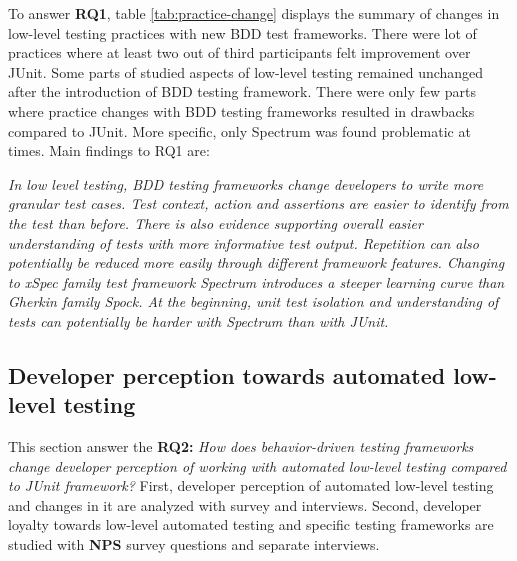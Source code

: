 To answer \textbf{RQ1}, table \ref{tab:practice-change} displays the summary of changes in low-level testing practices with new BDD test
frameworks. There were lot of practices where at least two out of third participants felt improvement over JUnit.
Some parts of studied aspects of low-level testing remained unchanged after the introduction of BDD testing framework.
There were only few parts where practice changes with BDD testing frameworks resulted in drawbacks compared to JUnit. More
specific, only Spectrum was found problematic at times. Main findings to RQ1 are:

\vskip 1mm
\begin{topbot}
\textit{In low level testing, BDD testing frameworks change developers to write more granular test cases. Test
context, action and assertions are easier to identify from the test than before. There is also evidence supporting
overall easier understanding of tests with more informative test output. Repetition can also potentially be reduced more easily through
different framework features.
\newline\newline Changing to xSpec family test framework Spectrum introduces a steeper learning curve than Gherkin family Spock.
At the beginning, unit test isolation and understanding of tests can potentially be harder with Spectrum than with JUnit.}
\end{topbot}

\clearpage


\subsection{Developer perception towards automated low-level testing}
This section answer the
\textbf{RQ2: }\textit{How does behavior-driven testing frameworks change developer perception of working with automated low-level
testing compared to JUnit framework?} First, developer perception of automated low-level testing and changes in it are
analyzed with survey and interviews. Second, developer loyalty towards low-level automated testing and specific testing
frameworks are studied with \textbf{NPS} survey questions and separate interviews.

